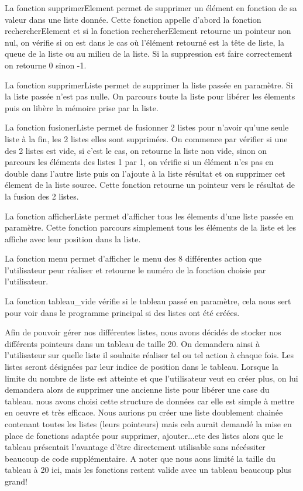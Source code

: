 \documentclass[11pt]{report}
\begin{document}
\medskip

La fonction supprimerElement permet de supprimer un élément en fonction de sa valeur dans une liste donnée. Cette fonction appelle d'abord la fonction rechercherElement et si la fonction rechercherElement retourne un pointeur non nul, on vérifie si on est dans le cas où l'élément retourné est la tête de liste, la queue de la liste ou au milieu de la liste. 
Si la suppression est faire correctement on retourne 0 sinon -1. 

\medskip

La fonction supprimerListe permet de supprimer la liste passée en paramètre. Si la liste passée n'est pas nulle. On parcours toute la liste pour libérer les élements puis on libère la mémoire prise par la liste. 

\medskip

La fonction fusionerListe permet de fusionner 2 listes pour n'avoir qu'une seule liste à la fin, les 2 listes elles sont supprimées. On commence par vérifier si une des 2 listes est vide, si c'est le cas, on retourne la liste non vide, sinon on parcours les éléments des listes 1 par 1, on vérifie si un élément n'es pas en double dans l'autre liste puis on l'ajoute à la liste résultat et on supprimer cet élement de la liste source. Cette fonction retourne un pointeur vers le résultat de la fusion des 2 listes. 

\medskip

La fonction afficherListe permet d'afficher tous les élements d'une liste passée en paramètre. Cette fonction parcours simplement tous les éléments de la liste et les affiche avec leur position dans la liste. 

\medskip

La fonction menu permet d'afficher le menu des 8 différentes action que l'utilisateur peur réaliser et retourne le numéro de la fonction choisie par l'utilisateur. 

\medskip

La fonction tableau\_vide vérifie si le tableau passé en paramètre, cela nous sert pour voir dans le programme principal si des listes ont été créées. 

\medskip

Afin de pouvoir gérer nos différentes listes, nous avons décidés de stocker nos différents pointeurs dans un tableau de taille 20. On demandera ainsi à l'utilisateur sur quelle liste il souhaite réaliser tel ou tel action à chaque fois. Les listes seront désignées par leur indice de position dans le tableau. Lorsque la limite du nombre de liste est atteinte et que l'utilisateur veut en créer plus, on lui demandera alors de supprimer une ancienne liste pour libérer une case du tableau. nous avons choisi cette structure de données car elle est simple à mettre en oeuvre et très efficace. Nous aurions pu créer une liste doublement chainée contenant toutes les listes (leurs pointeurs) mais cela aurait demandé la mise en place de fonctions adaptée pour supprimer, ajouter...etc des listes alors que le tableau présentait l'avantage d'être directement utilisable sans nécéssiter beaucoup de code supplémentaire. A noter que nous aons limité la taille du tableau à 20 ici, mais les fonctions restent valide avec un tableau beaucoup plus grand!
\end{document}
